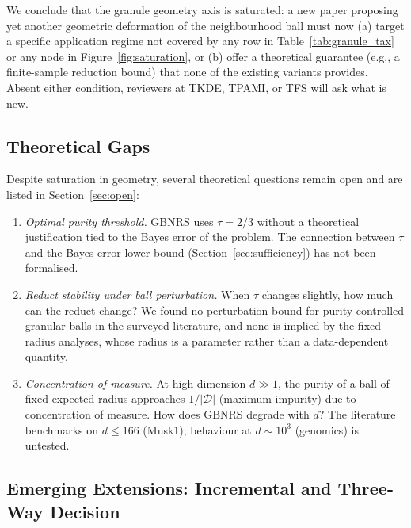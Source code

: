 We conclude that the granule geometry axis is saturated: a new
paper proposing yet another geometric deformation of the neighbourhood ball
must now (a) target a specific application regime not covered by any row in
Table~\ref{tab:granule_tax} or any node in Figure~\ref{fig:saturation}, or
(b) offer a theoretical guarantee (e.g., a finite-sample reduction bound)
that none of the existing variants provides.
Absent either condition, reviewers at TKDE, TPAMI, or TFS will ask what is
new.

\subsection{Theoretical Gaps}
\label{sec:geo_gaps}

Despite saturation in geometry, several theoretical questions remain open
and are listed in Section~\ref{sec:open}:

\begin{enumerate}
  \item \emph{Optimal purity threshold.}  GBNRS uses $\tau = 2/3$ without
        a theoretical justification tied to the Bayes error of the problem.
        The connection between $\tau$ and the Bayes error lower bound
        (Section~\ref{sec:sufficiency}) has not been formalised.
  \item \emph{Reduct stability under ball perturbation.}  When $\tau$
        changes slightly, how much can the reduct change?  We found no
        perturbation bound for purity-controlled granular balls in the
        surveyed literature, and none is implied by the fixed-radius
        analyses, whose radius is a parameter rather than a data-dependent
        quantity.
  \item \emph{Concentration of measure.}  At high dimension $d \gg 1$,
        the purity of a ball of fixed expected radius approaches $1/|\mathcal{D}|$
        (maximum impurity) due to concentration of measure.  How does GBNRS
        degrade with $d$?  The literature benchmarks on $d \leq 166$ (Musk1);
        behaviour at $d \sim 10^3$ (genomics) is untested.
\end{enumerate}

\subsection{Emerging Extensions: Incremental and Three-Way Decision}
\label{sec:geo_emerging}

